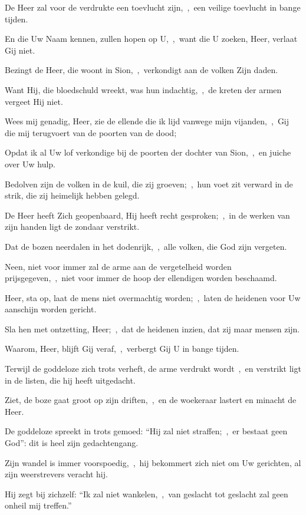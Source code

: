 \documentclass[12pt,twoside,a5paper]{article}
\begin{document}
\begin{halfparskip}
  De Heer zal voor de verdrukte een toevlucht zijn,~\sep\ een veilige toevlucht in bange tijden.

  En die Uw Naam kennen, zullen hopen op U,~\sep\ want die U zoeken, Heer, verlaat Gij niet.

  Bezingt de Heer, die woont in Sion,~\sep\ verkondigt aan de volken Zijn daden.

  Want Hij, die bloedschuld wreekt, was hun indachtig,~\sep\ de kreten der armen vergeet Hij niet.

  Wees mij genadig, Heer, zie de ellende die ik lijd vanwege mijn vijanden,~\sep\ Gij die mij terugvoert van de poorten van de dood;

  Opdat ik al Uw lof verkondige bij de poorten der dochter van Sion,~\sep\ en juiche over Uw hulp.

  Bedolven zijn de volken in de kuil, die zij groeven;~\sep\ hun voet zit verward in de strik, die zij heimelijk hebben gelegd.

  De Heer heeft Zich geopenbaard, Hij heeft recht gesproken;~\sep\ in de werken van zijn handen ligt de zondaar verstrikt.

  Dat de bozen neerdalen in het dodenrijk,~\sep\ alle volken, die God zijn vergeten.

  Neen, niet voor immer zal de arme aan de vergetelheid worden prijsgegeven,~\sep\ niet voor immer de hoop der ellendigen worden beschaamd.

  Heer, sta op, laat de mens niet overmachtig worden;~\sep\ laten de heidenen voor Uw aanschijn worden gericht.

  Sla hen met ontzetting, Heer;~\sep\ dat de heidenen inzien, dat zij maar mensen zijn.

   Waarom, Heer, blijft Gij veraf,~\sep\ verbergt Gij U in bange tijden.

  Terwijl de goddeloze zich trots verheft, de arme verdrukt wordt~\sep\ en verstrikt ligt in de listen, die hij heeft uitgedacht.

  Ziet, de boze gaat groot op zijn driften,~\sep\ en de woekeraar lastert en minacht de Heer.

  De goddeloze spreekt in trots gemoed: ``Hij zal niet straffen;~\sep\ er bestaat geen God'': dit is heel zijn
  gedachtengang.

  Zijn wandel is immer voorspoedig,~\sep\ hij bekommert zich niet om Uw gerichten, al zijn weerstrevers veracht hij.

  Hij zegt bij zichzelf: ``Ik zal niet wankelen,~\sep\ van geslacht tot geslacht zal geen onheil mij treffen.''


\end{halfparskip}
\end{document}
